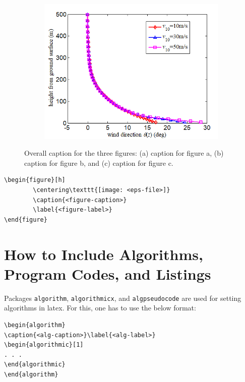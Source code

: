 \documentclass[12pt,a4paper]{article}
\begin{document}
\begin{figure}[!ht]
\begin{subfigure}{0.3\textwidth}
        \includegraphics[width=\linewidth]{figures/fig_c.png}
        \caption{}
    \end{subfigure}
    \caption{Overall caption for the three figures: (a) caption for figure a, (b) caption for figure b, and (c) caption for figure c.}
    \label{fig:multi_figs}
\end{figure}


\begin{verbatim}
\begin{figure}[h]
        \centering\texttt{[image: <eps-file>]}
        \caption{<figure-caption>}
        \label{<figure-label>}
\end{figure}
\end{verbatim}


\section{How to Include Algorithms, Program Codes, and Listings}\label{sec8}
Packages \verb+algorithm+, \verb+algorithmicx+, and \verb+algpseudocode+ are used for setting algorithms in latex.
For this, one has to use the below format:

\begin{verbatim}
\begin{algorithm}
\caption{<alg-caption>}\label{<alg-label>}
\begin{algorithmic}[1]
. . .
\end{algorithmic}
\end{algorithm}
\end{verbatim}
\end{document}
